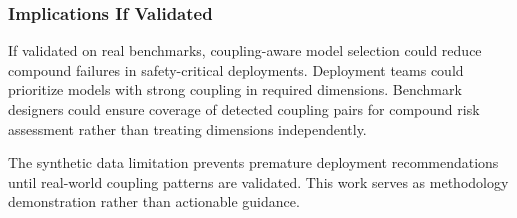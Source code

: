 \subsubsection{Implications If Validated}

If validated on real benchmarks, coupling-aware model selection could reduce compound failures in safety-critical deployments. Deployment teams could prioritize models with strong coupling in required dimensions. Benchmark designers could ensure coverage of detected coupling pairs for compound risk assessment rather than treating dimensions independently.

The synthetic data limitation prevents premature deployment recommendations until real-world coupling patterns are validated. This work serves as methodology demonstration rather than actionable guidance.
